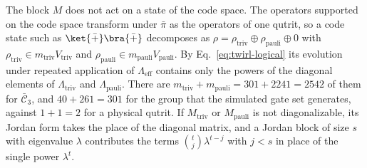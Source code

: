 The block $M$ does not act on a state of the code space. The operators supported on the code space transform under $\bar\pi$ as the operators of one qutrit, so a code state such as $\ket{\bar{+}}\bra{\bar{+}}$ decomposes as $\rho = \rho_{\mathrm{triv}} \oplus \rho_{\mathrm{pauli}} \oplus 0$ with $\rho_{\mathrm{triv}} \in m_{\mathrm{triv}} V_{\mathrm{triv}}$ and $\rho_{\mathrm{pauli}} \in m_{\mathrm{pauli}}V_{\mathrm{pauli}}$. By Eq.~\eqref{eq:twirl-logical} its evolution under repeated application of $\Lambda_{\mathrm{eff}}$ contains only the powers of the diagonal elements of $\Lambda_{\mathrm{triv}}$ and $\Lambda_{\mathrm{pauli}}$. There are $m_{\mathrm{triv}} + m_{\mathrm{pauli}} = 301 + 2241 = 2542$ of them for $\bar{\mathcal{C}}_3$, and $40 + 261 = 301$ for the group that the simulated gate set generates, against $1 + 1 = 2$ for a physical qutrit. If $M_{\mathrm{triv}}$ or $M_{\mathrm{pauli}}$ is not diagonalizable, its Jordan form takes the place of the diagonal matrix, and a Jordan block of size $s$ with eigenvalue $\lambda$ contributes the terms $\binom{t}{j}\lambda^{t-j}$ with $j < s$ in place of the single power $\lambda^t$.
